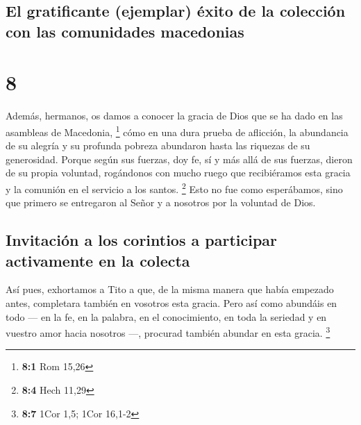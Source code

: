 \hypertarget{el-gratificante-ejemplar-uxe9xito-de-la-colecciuxf3n-con-las-comunidades-macedonias}{%
\subsection{El gratificante (ejemplar) éxito de la colección con las
comunidades
macedonias}\label{el-gratificante-ejemplar-uxe9xito-de-la-colecciuxf3n-con-las-comunidades-macedonias}}

\hypertarget{section-7}{%
\section{8}\label{section-7}}

 Además, hermanos, os damos a conocer la gracia de Dios
que se ha dado en las asambleas de Macedonia, \footnote{\textbf{8:1} Rom
  15,26}  cómo en una dura prueba de aflicción, la
abundancia de su alegría y su profunda pobreza abundaron hasta las
riquezas de su generosidad.  Porque según sus fuerzas, doy
fe, sí y más allá de sus fuerzas, dieron de su propia voluntad,
 rogándonos con mucho ruego que recibiéramos esta gracia y
la comunión en el servicio a los santos. \footnote{\textbf{8:4} Hech
  11,29}  Esto no fue como esperábamos, sino que primero
se entregaron al Señor y a nosotros por la voluntad de Dios.

\hypertarget{invitaciuxf3n-a-los-corintios-a-participar-activamente-en-la-colecta}{%
\subsection{Invitación a los corintios a participar activamente en la
colecta}\label{invitaciuxf3n-a-los-corintios-a-participar-activamente-en-la-colecta}}

 Así pues, exhortamos a Tito a que, de la misma manera que
había empezado antes, completara también en vosotros esta gracia.
 Pero así como abundáis en todo --- en la fe, en la
palabra, en el conocimiento, en toda la seriedad y en vuestro amor hacia
nosotros ---, procurad también abundar en esta gracia. \footnote{\textbf{8:7}
  1Cor 1,5; 1Cor 16,1-2}

